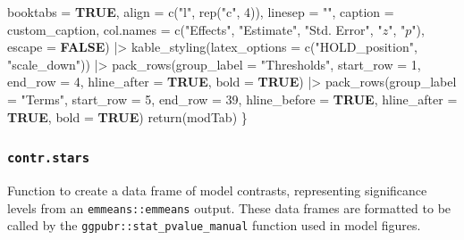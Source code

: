 \documentclass[
  bookmarksnumbered]{article}
\newenvironment{Shaded}{\begin{snugshade}}{\end{snugshade}}
\newcommand{\AttributeTok}[1]{\textcolor[rgb]{0.80,0.80,0.80}{#1}}
\newcommand{\ConstantTok}[1]{\textcolor[rgb]{0.86,0.64,0.64}{\textbf{#1}}}
\newcommand{\DecValTok}[1]{\textcolor[rgb]{0.86,0.86,0.80}{#1}}
\newcommand{\FunctionTok}[1]{\textcolor[rgb]{0.94,0.94,0.56}{#1}}
\newcommand{\NormalTok}[1]{\textcolor[rgb]{0.80,0.80,0.80}{#1}}
\newcommand{\SpecialCharTok}[1]{\textcolor[rgb]{0.86,0.64,0.64}{#1}}
\newcommand{\StringTok}[1]{\textcolor[rgb]{0.80,0.58,0.58}{#1}}
\begin{document}
\begin{Shaded}
\begin{Highlighting}[]
            \AttributeTok{booktabs =} \ConstantTok{TRUE}\NormalTok{,}
            \AttributeTok{align =} \FunctionTok{c}\NormalTok{(}\StringTok{"l"}\NormalTok{, }\FunctionTok{rep}\NormalTok{(}\StringTok{"c"}\NormalTok{, }\DecValTok{4}\NormalTok{)),}
            \AttributeTok{linesep =} \StringTok{""}\NormalTok{,}
            \AttributeTok{caption =}\NormalTok{ custom\_caption,}
            \AttributeTok{col.names =} \FunctionTok{c}\NormalTok{(}\StringTok{"Effects"}\NormalTok{,}
                          \StringTok{"Estimate"}\NormalTok{, }
                          \StringTok{"Std. Error"}\NormalTok{, }
                          \StringTok{"$z$"}\NormalTok{, }
                          \StringTok{"$p$"}\NormalTok{),}
            \AttributeTok{escape =} \ConstantTok{FALSE}\NormalTok{) }\SpecialCharTok{|\textgreater{}} 
    \FunctionTok{kable\_styling}\NormalTok{(}\AttributeTok{latex\_options =} \FunctionTok{c}\NormalTok{(}\StringTok{"HOLD\_position"}\NormalTok{, }\StringTok{"scale\_down"}\NormalTok{)) }\SpecialCharTok{|\textgreater{}}
    \FunctionTok{pack\_rows}\NormalTok{(}\AttributeTok{group\_label =} \StringTok{"Thresholds"}\NormalTok{,}
              \AttributeTok{start\_row =} \DecValTok{1}\NormalTok{,}
              \AttributeTok{end\_row =} \DecValTok{4}\NormalTok{,}
              \AttributeTok{hline\_after =} \ConstantTok{TRUE}\NormalTok{,}
              \AttributeTok{bold =} \ConstantTok{TRUE}\NormalTok{) }\SpecialCharTok{|\textgreater{}}
    \FunctionTok{pack\_rows}\NormalTok{(}\AttributeTok{group\_label =} \StringTok{"Terms"}\NormalTok{,}
              \AttributeTok{start\_row =} \DecValTok{5}\NormalTok{,}
              \AttributeTok{end\_row =} \DecValTok{39}\NormalTok{,}
              \AttributeTok{hline\_before =} \ConstantTok{TRUE}\NormalTok{,}
              \AttributeTok{hline\_after =} \ConstantTok{TRUE}\NormalTok{,}
              \AttributeTok{bold =} \ConstantTok{TRUE}\NormalTok{)}
  \FunctionTok{return}\NormalTok{(modTab)}
\NormalTok{\}}
\end{Highlighting}
\end{Shaded}

\hypertarget{contr.stars}{%
\subsubsection{\texorpdfstring{\texttt{contr.stars}}{contr.stars}}\label{contr.stars}}

Function to create a data frame of model contrasts, representing significance levels from an \texttt{emmeans::emmeans} output. These data frames are formatted to be called by the \texttt{ggpubr::stat\_pvalue\_manual} function used in model figures.
\end{document}
